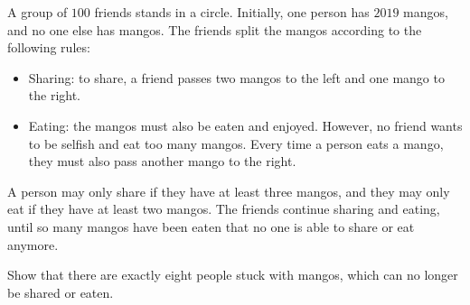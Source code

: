 \documentclass[mast]{lucky}
\begin{document}
\begin{prob}[USAMTS 2019]{9}
A group of $100$ friends stands in a circle. Initially, one person has $2019$ mangos, and
no one else has mangos. The friends split the mangos according to the following rules:

\begin{itemize}
     \item Sharing: to share, a friend passes two mangos to the left and one mango to the right.

     \item Eating: the mangos must also be eaten and enjoyed. However, no friend wants to be
selfish and eat too many mangos. Every time a person eats a mango, they must also
pass another mango to the right.
\end{itemize}

A person may only share if they have at least three mangos, and they may only eat if they
have at least two mangos. The friends continue sharing and eating, until so many mangos
have been eaten that no one is able to share or eat anymore.

Show that there are exactly eight people stuck with mangos, which can no longer be shared or eaten.
\end{prob}
%
%
\end{document}
